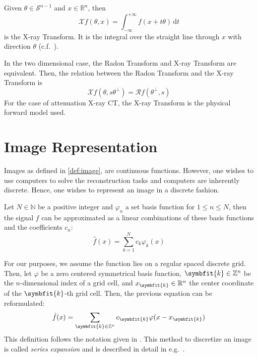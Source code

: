 \begin{definition}
	Given \(\theta \in \mathscr{S}^{n-1}\) and \(x \in \mathbb{R}^n\), then
	\[ \mathscr{X}f(\theta, x) = \int_{-\infty}^{+\infty} f(x + t \theta) \, \mathrm{d}t\]
	is the X-ray Transform. It is the integral over the straight line through \(x\) with
	direction \(\theta\) (c.f.~\cite{natterer_mathematics_1986,solmon_x-ray_1976}).
\end{definition}

In the two dimensional case, the Radon Transform and X-ray Transform are equivalent.
Then, the relation between the Radon Transform and the X-ray Transform is
\[\mathscr{X}f(\theta, s\theta^\perp) = \mathscr{R}f(\theta^\perp, s)\]
For the case of attenuation X-ray CT, the X-ray Transform is the physical forward model used.

\chapter{Image Representation}\label{chap:image_representation}

Images as defined in \ref{def:image}, are continuous functions. However, one wishes to use computers
to solve the reconstruction tasks and computers are inherently discrete. Hence, one wishes to
represent an image in a discrete fashion.

\begin{definition}
	\label{def:permissible_representation}
	Let \(N \in \mathbb{N}\) be a positive integer and \(\varphi_n\) a set basis function for
	\(1 \leq n \leq N\), then the signal \(f\) can be approximated as a linear combinations
	of these basis functions and the coefficients \(c_n\):
	\[ \hat{f}(x) = \sum_{k=1}^{N} c_k \varphi_k(x) \]
\end{definition}

For our purposes, we assume the function lies on a regular spaced discrete grid. Then, let
\(\varphi\) be a zero centered symmetrical basis function, \(\symbfit{k} \in \mathbb{Z}^n\) be the
\(n\)-dimensional index of a grid cell, and \(x_{\symbfit{k}} \in \mathbb{R}^n\) the center coordinate
of the \(\symbfit{k}\)-th grid cell. Then, the previous equation can be reformulated:
\[ \hat{f}(x) = \sum_{\symbfit{k} \in \mathbb{Z}^n} c_{\symbfit{k}} \varphi(x - x_{\symbfit{k}}) \]
This definition follows the notation given in \cite{momey_new_2011}. This method to discretize an
image is called \textit{series expansion} and is described in detail in
e.g.~\cite{herman_basis_2015}.

